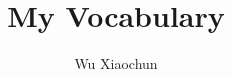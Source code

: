 ﻿\documentclass[12pt,twocolumn]{article}
\title{My Vocabulary}
\author{Wu Xiaochun}
\begin{document}
\date{}


\setlength{\shadowsize}{1pt}

\setlength{\columnseprule}{1pt}

\newcommand{\myword}[6]{%
\shadowbox{%
\colorbox{LightYellow1}{\begin{minipage}{0.93\columnwidth}%
\textcolor{DeepSkyBlue3}{\textsf{\Large #2}} %
\phonetic{#3} \textcolor{Green4}{\textit{#4}} %
#5 #6 \textcolor{Green4}{\textsf{#1}}%
\end{minipage}}%
}%
}%


% 

\end{document}
